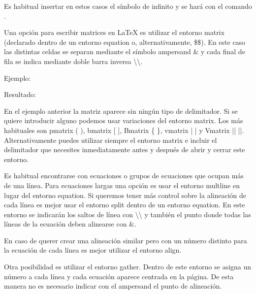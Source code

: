 \documentclass[11pt, a4paper]{article}
\begin{document}
Es habitual insertar en estos casos el símbolo de infinito y se hará con el comando .

Una opción para escribir matrices en LaTeX es utilizar el entorno matrix (declarado dentro de un entorno equation o, alternativamente, \$\$). En este caso las distintas celdas se separan mediante el símbolo ampersand \& y cada final de fila se indica mediante doble barra inversa \textbackslash\textbackslash.

Ejemplo:






Resultado:


En el ejemplo anterior la matriz aparece sin ningún tipo de delimitador. Si se quiere introducir alguno podemos usar variaciones del entorno matrix. Los más habituales son pmatrix ( ), bmatrix [ ], Bmatrix \{ \}, vmatrix | |  y  Vmatrix ||  ||. Alternativamente puedes utilizar siempre el entorno matrix e incluir el delimitador que necesites inmediatamente antes y después de abrir y cerrar este entorno.

Es habitual encontrarse con ecuaciones o grupos de ecuaciones que ocupan más de una línea. Para ecuaciones largas una opción es usar el entorno multline en lugar del entorno equation. Si queremos tener más control sobre la alineación de cada línea es mejor usar el entorno split dentro de un entorno equation. En este entorno se indicarán los saltos de línea con \textbackslash\textbackslash \; y también el punto donde todas las líneas de la ecuación deben alinearse con \&.

En caso de querer crear una alineación similar pero con un número distinto para la ecuación de cada línea es mejor utilizar el entorno align.

Otra posibilidad es utilizar el entorno gather. Dentro de este entorno se asigna un número a cada línea y cada ecuación aparece centrada en la página. De esta manera no es necesario indicar con el ampersand el punto de alineación.
\end{document}
